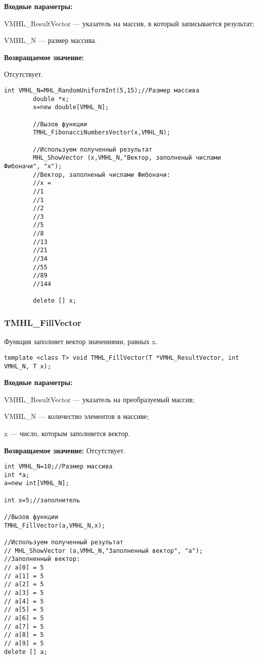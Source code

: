 \documentclass[a4paper,12pt]{article}
\begin{document}
\textbf{Входные параметры:}

 VMHL\_ResultVector --- указатель на массив, в который записывается результат;
 
 VMHL\_N --- размер массива.

\textbf{Возвращаемое значение:}

Отсутствует.


\begin{lstlisting}[label=code_use_TMHL_FibonacciNumbersVector,caption=Пример использования]
        int VMHL_N=MHL_RandomUniformInt(5,15);//Размер массива
        double *x;
        x=new double[VMHL_N];

        //Вызов функции
        TMHL_FibonacciNumbersVector(x,VMHL_N);

        //Используем полученный результат
        MHL_ShowVector (x,VMHL_N,"Вектор, заполненый числами Фибоначи", "x");
        //Вектор, заполненый числами Фибоначи:
        //x =	
        //1
        //1
        //2
        //3
        //5
        //8
        //13
        //21
        //34
        //55
        //89
        //144
        
        delete [] x;
\end{lstlisting}

\subsubsection{TMHL\_FillVector}\label{TMHL_FillVector}

Функция заполняет вектор значениями, равных x.


\begin{lstlisting}[label=code_syntax_TMHL_FillVector,caption=Синтаксис]
template <class T> void TMHL_FillVector(T *VMHL_ResultVector, int VMHL_N, T x);
\end{lstlisting}

\textbf{Входные параметры:}

 VMHL\_ResultVector --- указатель на преобразуемый массив;
 
 VMHL\_N --- количество элементов в массиве;
 
 x --- число, которым заполняется вектор.

\textbf{Возвращаемое значение:}
Отсутствует.


\begin{lstlisting}[label=code_use_TMHL_FillVector,caption=Пример использования]
int VMHL_N=10;//Размер массива
int *a;
a=new int[VMHL_N];

int x=5;//заполнитель

//Вызов функции
TMHL_FillVector(a,VMHL_N,x);

//Используем полученный результат
// MHL_ShowVector (a,VMHL_N,"Заполненный вектор", "a");
//Заполненный вектор:
// a[0] = 5
// a[1] = 5
// a[2] = 5
// a[3] = 5
// a[4] = 5
// a[5] = 5
// a[6] = 5
// a[7] = 5
// a[8] = 5
// a[9] = 5
delete [] a;
\end{lstlisting}
\end{document}
